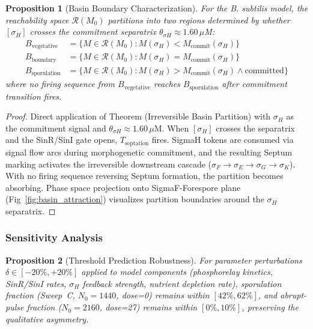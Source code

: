 \documentclass[10pt,letterpaper]{article}
\newtheorem{proposition}{Proposition}
\begin{document}
\begin{proposition}[Basin Boundary Characterization]
For the B. subtilis model, the reachability space $\mathcal{R}(M_0)$ partitions into two regions determined by whether $[\sigma_H]$ crosses the commitment separatrix $\theta_{\sigma H} \approx 1.60\,\mu$M:
\begin{align*}
B_{\text{vegetative}} &= \{M \in \mathcal{R}(M_0) : M(\sigma_H) < M_{\text{commit}}(\sigma_H)\} \\
B_{\text{boundary}} &= \{M \in \mathcal{R}(M_0) : M(\sigma_H) = M_{\text{commit}}(\sigma_H)\} \\
B_{\text{sporulation}} &= \{M \in \mathcal{R}(M_0) : M(\sigma_H) > M_{\text{commit}}(\sigma_H) \wedge \text{committed}\}
\end{align*}
where no firing sequence from $B_{\text{vegetative}}$ reaches $B_{\text{sporulation}}$ after commitment transition fires.
\end{proposition}

\begin{proof}
Direct application of Theorem (Irreversible Basin Partition) with $\sigma_H$ as the commitment signal and $\theta_{\sigma H} \approx 1.60\,\mu$M.
When $[\sigma_H]$ crosses the separatrix and the SinR/SinI gate opens, $T_{\mathrm{septation}}$ fires. SigmaH tokens are consumed via signal flow arcs during morphogenetic commitment, and the resulting Septum marking activates the irreversible downstream cascade ($\sigma_F \to \sigma_E \to \sigma_G \to \sigma_K$). With no firing sequence reversing Septum formation, the partition becomes absorbing. Phase space projection onto SigmaF-Forespore plane (Fig~\ref{fig:basin_attraction}) visualizes partition boundaries around the $\sigma_H$ separatrix.
\end{proof}

\subsubsection{Sensitivity Analysis}

\begin{proposition}[Threshold Prediction Robustness]
For parameter perturbations $\delta \in [-20\%, +20\%]$ applied to model components (phosphorelay kinetics, SinR/SinI rates, $\sigma_H$ feedback strength, nutrient depletion rate), sporulation fraction (Sweep~C, $N_0=1440$, dose=0) remains within $[42\%, 62\%]$, and abrupt-pulse fraction ($N_0=2160$, dose=27) remains within $[0\%, 10\%]$, preserving the qualitative asymmetry.
\end{proposition}
\end{document}
